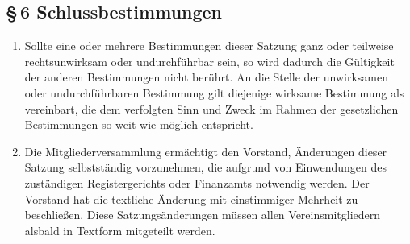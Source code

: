 \documentclass[12pt,a4paper]{article}
\begin{document}
\subsection*{§\,6 Schlussbestimmungen}
\begin{enumerate}
\item Sollte eine oder mehrere Bestimmungen dieser Satzung ganz oder teilweise rechtsunwirksam oder undurchführbar sein, so wird dadurch die Gültigkeit der anderen Bestimmungen nicht berührt. An die Stelle der unwirksamen oder undurchführbaren Bestimmung gilt diejenige wirksame Bestimmung als vereinbart, die dem verfolgten Sinn und Zweck im Rahmen der gesetzlichen Bestimmungen so weit wie möglich entspricht.
\item Die Mitgliederversammlung ermächtigt den Vorstand, Änderungen dieser Satzung selbstständig vorzunehmen, die aufgrund von Einwendungen des zuständigen Registergerichts oder Finanzamts notwendig werden. Der Vorstand hat die textliche Änderung mit einstimmiger Mehrheit zu beschließen.  Diese Satzungsänderungen müssen allen Vereinsmitgliedern alsbald in Textform mitgeteilt werden.
\end{enumerate}
\end{document}
